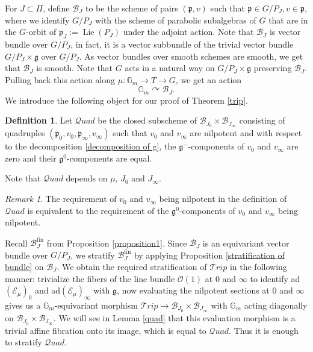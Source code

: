 \documentclass{amsart}
\newcommand{\cE}{\mathcal{E}}
\newcommand{\cQuad}{\mathcal{Q}uad}
\newcommand{\gm}{\mathbb{G}_{m}}
\theoremstyle{plain}
\theoremstyle{definition}
\newtheorem{definition}{Definition}
\theoremstyle{remark}
\newtheorem{remark}{Remark}[section]
\DeclareMathOperator{\lie}{Lie}
\DeclareMathOperator{\fin}{fin}
\begin{document}
For $J\subset\Pi$, define $\mathcal{B}_{J}$ to be the scheme of pairs $(\mathfrak{p},v)$ such that $\mathfrak{p}\in G/P_{J},v\in\mathfrak{p}$,
where we identify $G/P_{J}$ with the scheme of parabolic subalgebras of $G$ that are 
in the $G$-orbit of $\mathfrak{p}_{J}:=\lie(P_{J})$ under the adjoint action. Note that $\mathcal{B}_{J}$ is vector bundle over $G/P_{J}$, in fact, it is a vector subbundle of the trivial vector bundle $G/P_{J}\times\mathfrak{g}$ over $G/P_{J}$. As vector bundles over smooth schemes are smooth, we get that 
$\mathcal{B}_{J}$ is smooth. Note that $G$ acts in a natural way on $G/P_{J}\times\mathfrak{g}$ preserving $\mathcal{B}_{J}$. Pulling back this action along $\mu:\gm\rightarrow T\rightarrow G$, we get an action
\begin{equation}\label{action on B_J}
    \gm\curvearrowright\mathcal{B}_{J}.
\end{equation} 
We introduce the following object for our proof of Theorem \ref{trip}.
\begin{definition}\label{definition of quad}
Let $\cQuad$ be the closed subscheme of $\mathcal{B}_{J_{0}}\times\mathcal{B}_{J_{\infty}}$ consisting of quadruples $(\mathfrak{p}_{0},v_0,\mathfrak{p}_{\infty},v_{\infty})$ such that $v_{0}$ and $v_{\infty}$ are nilpotent and with respect to the decomposition \eqref{decomposition of g}, the $\mathfrak{g}^{-}$-components of $v_{0}$ and $v_{\infty}$ are zero and their $\mathfrak{g}^{0}$-components are equal.  
\end{definition}
Note that $\cQuad$ depends on $\mu$, $J_{0}$ and $J_{\infty}$.
\begin{remark}\label{equivalent definition of Quad}
The requirement of $v_{0}$ and $v_{\infty}$ being nilpotent in the definition of $\cQuad$ is equivalent to the requirement of the $\mathfrak{g}^{0}$-components of $v_{0}$ and $v_{\infty}$ being nilpotent.
\end{remark}
Recall $\mathcal{B}_{J}^{\fin}$ from Proposition \ref{proposition1}. Since $\mathcal{B}_{J}$ is an equivariant vector bundle over $G/P_{J}$, we stratify $\mathcal{B}_{J}^{\fin}$ by applying Proposition \ref{stratification of bundle} on $\mathcal{B}_{J}$.
We obtain the required stratification of $\mathcal{T}rip$ in the following manner: trivialize the fibers of the line bundle $\mathcal{O}(1)$ at $0$ and $\infty$ to identify ad$(\cE_{\mu})_{0}$ and ad$(\cE_{\mu})_{\infty}$ with $\mathfrak{g}$, now evaluating the nilpotent sections at $0$ and $\infty$ gives us a $\gm$-equivariant morphism $\mathcal{T}rip\rightarrow\mathcal{B}_{J_{0}}\times\mathcal{B}_{J_{\infty}}$ with $\gm$ acting diagonally on $\mathcal{B}_{J_{0}}\times\mathcal{B}_{J_{\infty}}$. We will see in Lemma \ref{quad} that this evaluation morphism is a trivial affine fibration onto its image, which is equal to $\cQuad$. Thus it is enough to stratify $\cQuad$.
\end{document}

